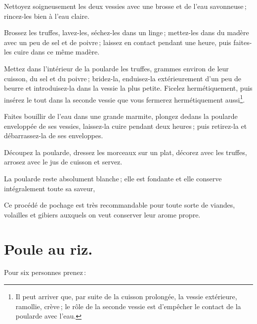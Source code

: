 Nettoyez soigneusement les deux vessies avec une brosse et de l’eau
savonneuse ; rincez-les bien à l'eau claire.

Brossez les truffes, lavez-les, séchez-les dans un linge ; mettez-les dans du
madère avec un peu de sel et de poivre ; laissez en contact pendant une heure,
puis faites-les cuire dans ce même madère.

Mettez dans l'intérieur de la poularde les truffes, {\mmm} grammes environ de leur
cuisson, du sel et du poivre ; bridez-la, enduisez-la extérieurement d’un peu
de beurre et introduisez-la dans la vessie la plus petite. Ficelez
hermétiquement, puis insérez le tout dans la seconde vessie que vous fermerez
hermétiquement aussi\footnote{Il peut arriver que, par suite de la cuisson
prolongée, la vessie extérieure, ramollie, crève ; le rôle de la seconde vessie
est d'empêcher le contact de la poularde avec l'eau.}.

Faites bouillir de l'eau dans une grande marmite, plongez dedans la poularde
enveloppée de ses vessies, laissez-la cuire pendant deux heures ; puis
retirez-la et débarrassez-la de ses enveloppes.

Découpez la poularde, dressez les morceaux sur un plat, décorez avec les
truffes, arrosez avec le jus de cuisson et servez.

La poularde reste absolument blanche ; elle est fondante et elle conserve
intégralement toute sa saveur,

Ce procédé de pochage est très recommandable pour toute sorte de viandes,
volailles et gibiers auxquels on veut conserver leur arome propre.

\section*{\centering Poule au riz.}
{}

Pour six personnes prenez :

\medskip

